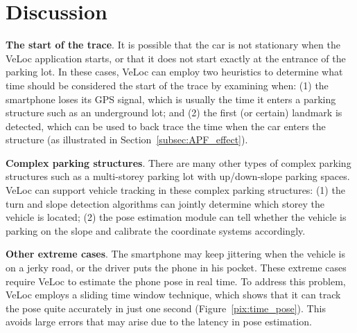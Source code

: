 \section{Discussion}\label{sec:discussion}

\textbf{The start of the trace}. It is possible that the car is not stationary when the VeLoc application starts, or that it does not start exactly at the entrance of the parking lot. In these cases, VeLoc can employ two heuristics to determine what time should be considered the start of the trace by examining when: (1) the smartphone loses its GPS signal, which is usually the time it enters a parking structure such as an underground lot; and (2) the first (or certain) landmark is detected, which can be used to back trace the time when the car enters the structure (as illustrated in Section~\ref{subsec:APF_effect}).


\textbf{Complex parking structures}. There are many other types of complex parking structures such as a multi-storey parking lot with up/down-slope parking spaces. VeLoc can support vehicle tracking in these complex parking structures: (1) the turn and slope detection algorithms can jointly determine which storey the vehicle is located; (2) the pose estimation module can tell whether the vehicle is parking on the slope and calibrate the coordinate systems accordingly.


\textbf{Other extreme cases}. The smartphone may keep jittering when the vehicle is on a jerky road, or the driver puts the phone in his pocket. These extreme cases require VeLoc to estimate the phone pose in real time. To address this problem, VeLoc employs a sliding time window technique, which shows that it can track the pose quite accurately in just one second (Figure~\ref{pix:time_pose}). This avoids large errors that may arise due to the latency in pose estimation.










